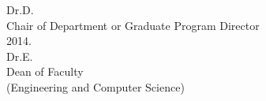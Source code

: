 \documentclass[11pt, a4paper, oneside]{Thesis} %
\begin{document}
    \hspace*{79pt}Dr.\@ D. \\
    \hspace*{79pt}Chair of Department or Graduate Program Director\\[6ex]
    \underline{\hspace*{100pt}} \hspace{10pt}  2014. \hspace{64pt} \underline{\hspace{200pt}}\\
    \hspace*{213pt}Dr.\@ E. \\
    \hspace*{213pt}Dean of Faculty\\    
    \hspace*{213pt}(Engineering and Computer Science)



\end{document}
